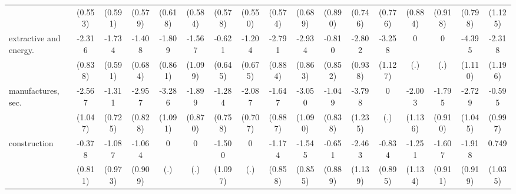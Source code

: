 {\begin{tabular}{l*{16}{c}}
                    &     (0.553)         &     (0.591)         &     (0.579)         &     (0.618)         &     (0.584)         &     (0.578)         &     (0.550)         &     (0.574)         &     (0.689)         &     (0.890)         &     (0.746)         &     (0.776)         &     (0.884)         &     (0.918)         &     (0.798)         &     (1.125)         \\
[1em]
extractive and energy.&      -2.316\sym{**} &      -1.734\sym{**} &      -1.408\sym{*}  &      -1.809\sym{*}  &      -1.567         &      -0.621         &      -1.204         &      -2.791\sym{**} &      -2.934\sym{***}&      -0.810         &      -2.802\sym{**} &      -3.258\sym{**} &           0         &           0         &      -4.395\sym{***}&      -2.318         \\
                    &     (0.838)         &     (0.591)         &     (0.684)         &     (0.861)         &     (1.099)         &     (0.645)         &     (0.675)         &     (0.884)         &     (0.863)         &     (0.852)         &     (0.938)         &     (1.127)         &         (.)         &         (.)         &     (1.110)         &     (1.196)         \\
[1em]
manufactures, sec.  &      -2.567\sym{*}  &      -1.311         &      -2.957\sym{***}&      -3.286\sym{**} &      -1.899\sym{*}  &      -1.284         &      -2.087\sym{**} &      -1.647         &      -3.050\sym{**} &      -1.049         &      -3.798\sym{**} &           0         &      -2.003         &      -1.795\sym{*}  &      -2.729\sym{**} &      -0.595         \\
                    &     (1.047)         &     (0.725)         &     (0.828)         &     (1.091)         &     (0.870)         &     (0.758)         &     (0.707)         &     (0.887)         &     (1.090)         &     (0.838)         &     (1.235)         &         (.)         &     (1.136)         &     (0.910)         &     (1.045)         &     (0.997)         \\
[1em]
construction        &      -0.378         &      -1.087         &      -1.064         &           0         &           0         &      -1.500         &           0         &      -1.174         &      -1.545         &      -0.651         &      -2.463\sym{*}  &      -0.834         &      -1.251         &      -1.607         &      -1.918\sym{*}  &       0.749         \\
                    &     (0.811)         &     (0.973)         &     (0.909)         &         (.)         &         (.)         &     (1.097)         &         (.)         &     (0.858)         &     (0.855)         &     (0.889)         &     (1.139)         &     (0.895)         &     (1.134)         &     (0.911)         &     (0.919)         &     (1.035)         \\

\end{tabular}}
